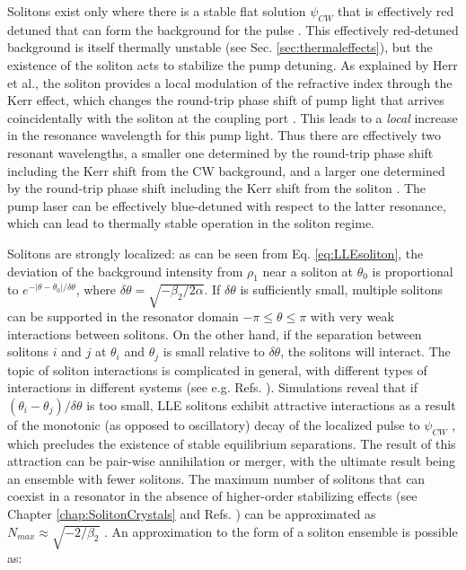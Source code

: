 Solitons exist only where there is a stable flat solution $\psi_{CW}$ that is effectively red detuned that can form the background for the pulse \cite{Barashenkov1996,Coen2013}. This effectively red-detuned background is itself thermally unstable (see Sec. \ref{sec:thermaleffects}), but the existence of the soliton acts to stabilize the pump detuning. As explained by Herr et al., the soliton provides a local modulation of the refractive index through the Kerr effect, which changes the round-trip phase shift of pump light that arrives coincidentally with the soliton at the coupling port \cite{Herr2014}. This leads to a \textit{local} increase in the resonance wavelength for this pump light. Thus there are effectively two resonant wavelengths, a smaller one determined by the round-trip phase shift including the Kerr shift from the CW background, and a larger one determined by the round-trip phase shift including the Kerr shift from the soliton \cite{Guo2017a}. The pump laser can be effectively blue-detuned with respect to the latter resonance, which can lead to thermally stable operation in the soliton regime.


Solitons are strongly localized: as can be seen from Eq. \ref{eq:LLEsoliton}, the deviation of the background intensity from $\rho_1$ near a soliton at $\theta_0$ is proportional to $e^{-|\theta-\theta_0|/\delta\theta}$, where $\delta\theta=\sqrt{-\beta_2/2\alpha}$. If $\delta\theta$ is sufficiently small, multiple solitons can be supported in the resonator domain $-\pi\leq\theta\leq\pi$ with very weak interactions between solitons. On the other hand, if the separation between solitons $i$ and $j$ at $\theta_i$ and $\theta_j$ is small relative to $\delta\theta$, the solitons will interact. The topic of soliton interactions is complicated in general, with different types of interactions in different systems (see e.g. Refs. ). Simulations reveal that if $(\theta_i-\theta_j)/\delta\theta$ is too small, LLE solitons exhibit attractive interactions as a result of the monotonic (as opposed to oscillatory) decay of the localized pulse to $\psi_{CW}$ \cite{Parra-Rivas2017}, which precludes the existence of stable equilibrium separations. The result of this attraction can be pair-wise annihilation or merger, with the ultimate result being an ensemble with fewer solitons. The maximum number of solitons that can coexist in a resonator in the absence of higher-order stabilizing effects (see Chapter \ref{chap:SolitonCrystals} and Refs. ) can be approximated as $N_{max}\approx\sqrt{-2/\beta_2}$ \cite{Herr2014}. An approximation to the form of a soliton ensemble is possible as:

